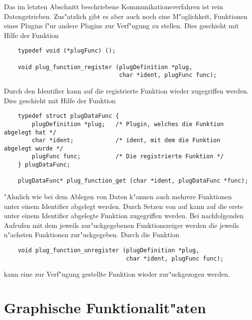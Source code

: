 Das im letzten Abschnitt beschriebene Kommunikationsverfahren ist
rein Datengetrieben. Zus"atzlich gibt es aber auch noch eine
M"oglichkeit, Funktionen eines Plugins f"ur andere Plugins zur
Verf"ugung zu stellen. Dies geschieht mit Hilfe der Funktion
\begin{small}
\linespread{0.9}
\begin{verbatim}
    typedef void (*plugFunc) ();

    void plug_function_register (plugDefinition *plug,
                                 char *ident, plugFunc func);
\end{verbatim}
\end{small}
Durch den Identifier  kann auf die registrierte Funktion
wieder zugegriffen werden. Dies geschieht mit Hilfe der Funktion
\begin{small}
\linespread{0.9}
\begin{verbatim}
    typedef struct plugDataFunc {
        plugDefinition *plug;   /* Plugin, welches die Funktion abgelegt hat */
        char *ident;            /* ident, mit dem die Funktion abgelegt wurde */
        plugFunc func;          /* Die registrierte Funktion */
    } plugDataFunc;

    plugDataFunc* plug_function_get (char *ident, plugDataFunc *func);
\end{verbatim}
\end{small}
"Ahnlich wie bei dem Ablegen von Daten k"onnen auch mehrere
Funktionen unter einem Identifier abgelegt werden. Durch Setzen von
 auf  kann auf die erste unter einem Identifier
abgelegte Funktion zugegriffen werden. Bei nachfolgenden Aufrufen
mit dem jeweils zur"uckgegebenen Funktionszeiger werden die jeweils
n"achsten Funktionen zur"uckgegeben. Durch die Funktion
\begin{small}
\linespread{0.9}
\begin{verbatim}
    void plug_function_unregister (plugDefinition *plug,
                                   char *ident, plugFunc func);
\end{verbatim}
\end{small}
kann eine zur Verf"ugung gestellte Funktion wieder zur"uckgezogen
werden.

\section{Graphische Funktionalit"aten}
\label{sec:p_gui}

